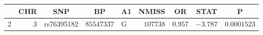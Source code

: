 \begin{tabular}{lrlrlrrrr}
\hline\hline
\multicolumn{1}{l}{}&\multicolumn{1}{c}{CHR}&\multicolumn{1}{c}{SNP}&\multicolumn{1}{c}{BP}&\multicolumn{1}{c}{A1}&\multicolumn{1}{c}{NMISS}&\multicolumn{1}{c}{OR}&\multicolumn{1}{c}{STAT}&\multicolumn{1}{c}{P}\tabularnewline
\hline
2&$3$&rs76395182&$85547337$&G&$107738$&$0.957$&$-3.787$&$0.0001523$\tabularnewline
\hline
\end{tabular}
